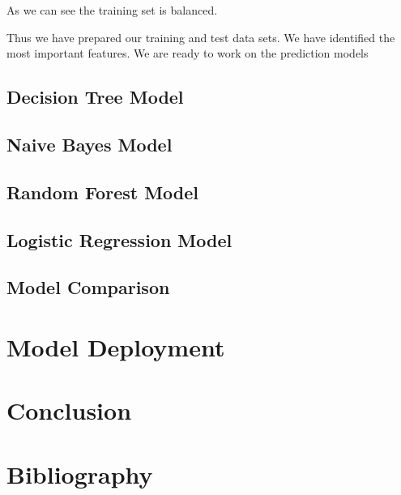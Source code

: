 As we can see the training set is balanced.

Thus we have prepared our training and test data sets. We have
identified the most important features. We are ready to work on the
prediction models

\hypertarget{decision-tree-model}{%
\subsection{Decision Tree Model}\label{decision-tree-model}}

\hypertarget{naive-bayes-model}{%
\subsection{Naive Bayes Model}\label{naive-bayes-model}}

\hypertarget{random-forest-model}{%
\subsection{Random Forest Model}\label{random-forest-model}}

\hypertarget{logistic-regression-model}{%
\subsection{Logistic Regression Model}\label{logistic-regression-model}}

\hypertarget{model-comparison}{%
\subsection{Model Comparison}\label{model-comparison}}

\hypertarget{model-deployment}{%
\section{Model Deployment}\label{model-deployment}}

\hypertarget{conclusion}{%
\section{Conclusion}\label{conclusion}}

\hypertarget{bibliography}{%
\section{Bibliography}\label{bibliography}}


\address{%
Sumaira Afzal\\
York University School of Continuing Studies\\
\\
}


\address{%
Viraja Ketkar\\
York University School of Continuing Studies\\
\\
}


\address{%
Murlidhar Loka\\
York University School of Continuing Studies\\
\\
}


\address{%
Vadim Spirkov\\
York University School of Continuing Studies\\
\\
}


